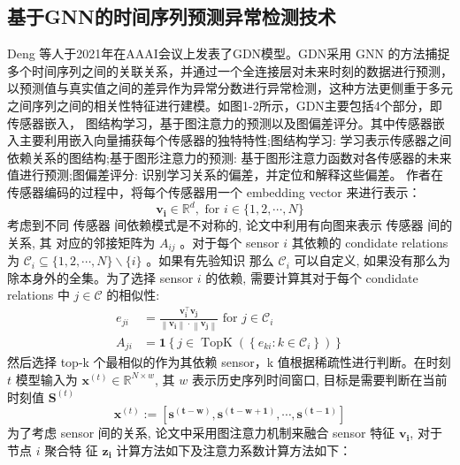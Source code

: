 \subsection{基于GNN的时间序列预测异常检测技术}
Deng 等人\cite{gdn}于2021年在AAAI会议上发表了GDN模型。GDN采用 GNN 的方法捕捉多个时间序列之间的关联关系，并通过一个全连接层对未来时刻的数据进行预测，以预测值与真实值之间的差异作为异常分数进行异常检测，这种方法更侧重于多元之间序列之间的相关性特征进行建模。如图1-2所示，GDN主要包括4个部分，即传感器嵌入， 图结构学习，基于图注意力的预测以及图偏差评分。其中传感器嵌入主要利用嵌入向量捕获每个传感器的独特特性;图结构学习: 学习表示传感器之间依赖关系的图结构;基于图形注意力的预测: 基于图形注意力函数对各传感器的未来值进行预测;图偏差评分: 识别学习关系的偏差，并定位和解释这些偏差。
作者在传感器编码的过程中，将每个传感器用一个 embedding vector 来进行表示：
\begin{equation}
    \mathbf{v}_{\mathbf{i}} \in \mathbb{R}^d, \text { for } i \in\{1,2, \cdots, N\}
    \end{equation}
考虑到不同 传感器 间依赖模式是不对称的, 论文中利用有向图来表示 传感器 间的关系, 其 对应的邻接矩阵为 $A_{i j}$ 。对于每个 sensor $i$ 其依赖的 condidate relations 为 $\mathcal{C}_i \subseteq\{1,2, \cdots, N\} \backslash\{i\}$ 。如果有先验知识 那么 $\mathcal{C}_i$ 可以自定义, 如果没有那么为除本身外的全集。为了选择 sensor $i$ 的依赖, 需要计算其对于每个 condidate relations 中 $j \in \mathcal{C}$ 的相似性:
\begin{equation}
    \begin{aligned}
    e_{j i} & =\frac{\mathbf{v}_{\mathbf{i}}^{\top} \mathbf{v}_{\mathbf{j}}}{\left\|\mathbf{v}_{\mathbf{i}}\right\| \cdot\left\|\mathbf{v}_{\mathbf{j}}\right\|} \text { for } j \in \mathcal{C}_i \\
    A_{j i} & =\mathbf{1}\left\{j \in \operatorname{TopK}\left(\left\{e_{k i}: k \in \mathcal{C}_i\right\}\right)\right\}
    \end{aligned}
    \end{equation}
然后选择 top-k 个最相似的作为其依赖 sensor，k 值根据稀疏性进行判断。在时刻 $t$ 模型输入为 $\mathbf{x}^{(t)} \in \mathbb{R}^{N \times w}$, 其 $w$ 表示历史序列时间窗口, 目标是需要判断在当前时刻值 $\mathbf{S}^{(t)}$
$$
\mathbf{x}^{(t)}:=\left[\mathbf{s}^{(\mathbf{t}-\mathbf{w})}, \mathbf{s}^{(\mathbf{t}-\mathbf{w}+\mathbf{1})}, \cdots, \mathbf{s}^{(\mathbf{t}-\mathbf{1})}\right]
$$
为了考虑 sensor 间的关系, 论文中采用图注意力机制来融合 sensor 特征 $\mathbf{v}_{\mathbf{i}}$, 对于节点 $i$ 聚合特 征 $\mathbf{z}_{\mathbf{i}}$ 计算方法如下及注意力系数计算方法如下： 
